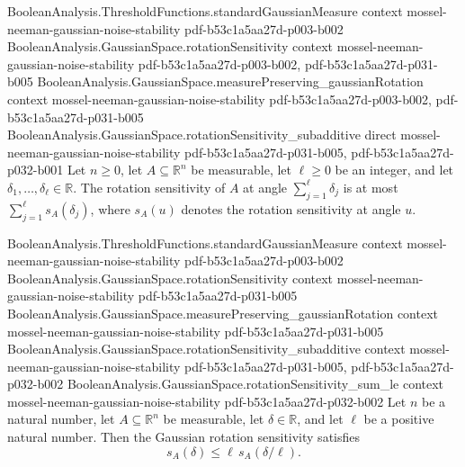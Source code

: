\begin{theorem}
\leanok
{}
\proofstep
  {BooleanAnalysis.ThresholdFunctions.standardGaussianMeasure}
  {context}
  {mossel-neeman-gaussian-noise-stability}
  {pdf-b53c1a5aa27d-p003-b002}
\proofstep
  {BooleanAnalysis.GaussianSpace.rotationSensitivity}
  {context}
  {mossel-neeman-gaussian-noise-stability}
  {pdf-b53c1a5aa27d-p003-b002,
    pdf-b53c1a5aa27d-p031-b005}
\proofstep
  {BooleanAnalysis.GaussianSpace.measurePreserving_gaussianRotation}
  {context}
  {mossel-neeman-gaussian-noise-stability}
  {pdf-b53c1a5aa27d-p003-b002,
    pdf-b53c1a5aa27d-p031-b005}
\proofstep
  {BooleanAnalysis.GaussianSpace.rotationSensitivity_subadditive}
  {direct}
  {mossel-neeman-gaussian-noise-stability}
  {pdf-b53c1a5aa27d-p031-b005,
    pdf-b53c1a5aa27d-p032-b001}
Let $n\ge 0$, let $A\subseteq\mathbb R^n$ be measurable, let $\ell\ge 0$ be an integer,
and let $\delta_1,\ldots,\delta_\ell\in\mathbb R$. The rotation sensitivity of $A$ at
angle $\sum_{j=1}^{\ell}\delta_j$ is at most $\sum_{j=1}^{\ell}s_A(\delta_j)$, where
$s_A(u)$ denotes the rotation sensitivity at angle $u$.
\end{theorem}

\begin{theorem}
\leanok
{}
\proofstep
  {BooleanAnalysis.ThresholdFunctions.standardGaussianMeasure}
  {context}
  {mossel-neeman-gaussian-noise-stability}
  {pdf-b53c1a5aa27d-p003-b002}
\proofstep
  {BooleanAnalysis.GaussianSpace.rotationSensitivity}
  {context}
  {mossel-neeman-gaussian-noise-stability}
  {pdf-b53c1a5aa27d-p031-b005}
\proofstep
  {BooleanAnalysis.GaussianSpace.measurePreserving_gaussianRotation}
  {context}
  {mossel-neeman-gaussian-noise-stability}
  {pdf-b53c1a5aa27d-p031-b005}
\proofstep
  {BooleanAnalysis.GaussianSpace.rotationSensitivity_subadditive}
  {context}
  {mossel-neeman-gaussian-noise-stability}
  {pdf-b53c1a5aa27d-p031-b005,
    pdf-b53c1a5aa27d-p032-b002}
\proofstep
  {BooleanAnalysis.GaussianSpace.rotationSensitivity_sum_le}
  {context}
  {mossel-neeman-gaussian-noise-stability}
  {pdf-b53c1a5aa27d-p032-b002}
Let $n$ be a natural number, let $A\subseteq\mathbb R^n$ be measurable, let
$\delta\in\mathbb R$, and let $\ell$ be a positive natural number. Then the Gaussian
rotation sensitivity satisfies $$s_A(\delta)\le \ell\,s_A(\delta/\ell).$$
\end{theorem}

